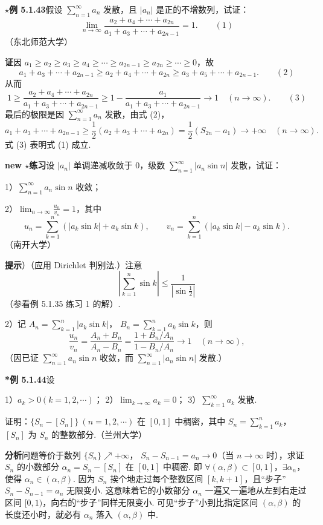 \documentclass[UTF8,12pt,a4paper,fontset=fandol]{ctexart}
\begin{document}
\noindent\textbf{$\star$例 5.1.43}\quad 假设 $\displaystyle\sum_{n=1}^{\infty}a_n$ 发散，且 $|a_n|$ 是正的不增数列，试证：
\[
  \lim_{n\to\infty}\frac{a_2+a_4+\cdots+a_{2n}}{a_1+a_3+\cdots+a_{2n-1}}=1.
\qquad(1)
\]
（东北师范大学）

\noindent\textbf{证}\quad 因 $a_1\ge a_2\ge a_3\ge a_4\ge\cdots\ge a_{2n-1}\ge a_{2n}\ge\cdots\ge0$，故
\[
  a_1+a_3+\cdots+a_{2n-1}
  \ge a_2+a_4+\cdots+a_{2n}
  \ge a_3+a_5+\cdots+a_{2n-1}.
\qquad(2)
\]
从而
\[
  1\ge\frac{a_2+a_4+\cdots+a_{2n}}{a_1+a_3+\cdots+a_{2n-1}}
  \ge1-\frac{a_1}{a_1+a_3+\cdots+a_{2n-1}}\to1\quad(n\to\infty).
\qquad(3)
\]
最后的极限是因 $\displaystyle\sum_{n=1}^{\infty}a_n$ 发散，由式 (2)，
\[
  a_1+a_3+\cdots+a_{2n-1}
  \ge\frac12(a_2+a_3+\cdots+a_{2n})
  =\frac12(S_{2n}-a_1)\to+\infty\quad(n\to\infty).
\]
式 (3) 表明式 (1) 成立.

\noindent\textbf{new $\star$练习}\quad 设 $|a_n|$ 单调递减收敛于 $0$，级数 $\displaystyle\sum_{n=1}^{\infty}|a_n\sin n|$ 发散，试证：

1）$\displaystyle\sum_{n=1}^{\infty}a_n\sin n$ 收敛；

2）$\displaystyle\lim_{n\to\infty}\frac{u_n}{v_n}=1$，其中
\[
  u_n=\sum_{k=1}^n(|a_k\sin k|+a_k\sin k),\qquad
  v_n=\sum_{k=1}^n(|a_k\sin k|-a_k\sin k).
\]
（南开大学）

\noindent\textbf{提示}）（应用 Dirichlet 判别法.）注意
\[
  \left|\sum_{k=1}^n\sin k\right|\le\frac1{\left|\sin\frac12\right|}
\]
（参看例 5.1.35 练习 1 的解）.

2）记
$A_n=\displaystyle\sum_{k=1}^n|a_k\sin k|$，
$B_n=\displaystyle\sum_{k=1}^n a_k\sin k$，则
\[
  \frac{u_n}{v_n}
  =\frac{A_n+B_n}{A_n-B_n}
  =\frac{1+B_n/A_n}{1-B_n/A_n}\to1\quad(n\to\infty),
\]
（因已证 $\displaystyle\sum_{n=1}^{\infty}a_n\sin n$ 收敛，而
$\displaystyle\sum_{n=1}^{\infty}|a_n\sin n|$ 发散.）

\noindent\textbf{*例 5.1.44}\quad 设

1）$a_k>0(k=1,2,\cdots)$；
2）$\displaystyle\lim_{k\to\infty}a_k=0$；
3）$\displaystyle\sum_{k=1}^{\infty}a_k$ 发散.

证明：$\{S_n-[S_n]\}\ (n=1,2,\cdots)$ 在 $[0,1]$ 中稠密，其中
$S_n=\displaystyle\sum_{k=1}^n a_k$，$[S_n]$ 为 $S_n$ 的整数部分.（兰州大学）

\noindent\textbf{分析}\quad 问题等价于数列 $\{S_n\}\nearrow+\infty$，
$S_n-S_{n-1}=a_n\to0$（当 $n\to\infty$ 时），求证 $S_n$ 的小数部分
$\alpha_n=S_n-[S_n]$ 在 $[0,1]$ 中稠密. 即 $\forall(\alpha,\beta)\subset[0,1]$，$\exists\alpha_n$，使得
$\alpha_n\in(\alpha,\beta)$. 因为 $S_n$ 挨个地走过每个整数区间 $[k,k+1]$，且“步子”$S_n-S_{n-1}=a_n$ 无限变小. 这意味着它的小数部分 $\alpha_n$ 一遍又一遍地从左到右走过区间 $[0,1)$，向右的“步子”同样无限变小. 可见“步子”小到比指定区间 $(\alpha,\beta)$ 的长度还小时，就必有 $\alpha_n$ 落入 $(\alpha,\beta)$ 中.
\end{document}
